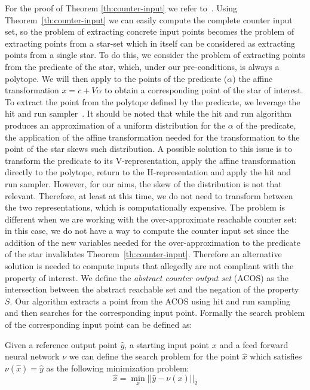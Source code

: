 For the proof of Theorem \ref{th:counter-input} we refer 
to~\cite{tran2020verification}.
Using Theorem~\ref{th:counter-input} we can easily compute the complete counter 
input set, so the problem of extracting concrete input points becomes the problem 
of extracting points from a star-set which in itself can be considered as 
extracting points from a single star. To do this, we consider the problem of 
extracting points from the predicate of the star, which, under our pre-conditions, 
is always a polytope. We will then apply to the points of the predicate ($\alpha$) 
the affine transformation $x = c + V \alpha$ to obtain a corresponding point of 
the star of interest. To extract the point from the polytope defined by the 
predicate, we leverage the hit and run sampler~\cite{DBLP:conf/wsc/Smith96}.
It should be noted that while the hit and run algorithm produces an approximation 
of a uniform distribution for the $\alpha$ of the predicate, the application of 
the affine transformation needed for the transformation to the point of the star 
skews such distribution. A possible solution to this issue is to transform the 
predicate to its V-representation, apply the affine transformation directly to the 
polytope, return to the H-representation and apply the hit and run sampler. 
However, for our aims, the skew of the distribution is not that relevant. 
Therefore, at least at this time, we do not need to transform between the two 
representations, which is computationally expensive.
%
The problem is different when we are working with the over-approximate reachable 
counter set: in this case, we do not have a way to compute the counter input set 
since the addition of the new variables needed for the over-approximation to the 
predicate of the star invalidates Theorem~\ref{th:counter-input}.
Therefore an alternative solution is needed to compute inputs that allegedly are 
not compliant with the property of interest. We define the \textit{abstract counter
	output set} (ACOS) as the intersection between the abstract reachable set and the
negation of the property $S$. Our algorithm extracts a point from the ACOS using hit 
and run sampling and then searches for the corresponding input point. Formally the 
search problem of the corresponding input point can be defined as:
\begin{definition}
	Given a reference output point $\hat{y}$, a starting input point $x$ and a feed 
	forward neural network $\nu$ we can define the search problem for the point 
	$\hat{x}$ which satisfies $\nu(\hat{x}) = \hat{y}$ as the following minimization 
	problem:
	\begin{equation*}
		\hat{x} = \min_{x} ||\hat{y} - \nu(x)||_2
	\end{equation*}
\end{definition}

